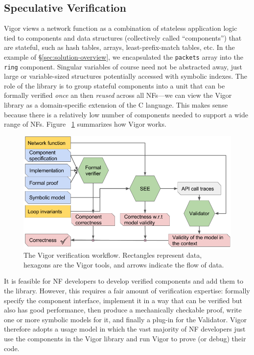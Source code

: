 \documentclass[letterpaper,twocolumn,10pt]{article}
\newcommand{\code}[1]{\lstinline{#1}}
\begin{document}
\subsection{Speculative Verification}
\label{sec:our-approach}

Vigor views a network function as a combination of stateless application logic tied to components and data structures (collectively called ``components'') that are stateful, such as hash tables, arrays, least-prefix-match tables, etc. In the example of \S\ref{sec:solution-overview}, we encapsulated the \code{packets} array into the \code{ring} component. Singular variables of course need not be abstracted away, just large or variable-sized structures potentially accessed with symbolic indexes. The role of the library is to group stateful components into a unit that can be formally verified {\em once} an then {\em reused} across all NFs---we can view the Vigor library as a domain-specific extension of the C language. This makes sense because there is a relatively low number of components needed to support a wide range of NFs. Figure~ \ref{fig:algo} summarizes how Vigor works.

\begin{figure}[]
    \includegraphics[width=\columnwidth]{figures/vigor_algorithm.png}
    \caption{The Vigor verification workflow. Rectangles represent data, hexagons are the Vigor tools, and arrows indicate the flow of data.}
    \label{fig:algo}
\end{figure}

It is feasible for NF developers to develop verified components and add them to the library. However, this requires a fair amount of verification expertise: formally specify the component interface, implement it in a way that can be verified but also has good performance, then produce a mechanically checkable proof, write one or more symbolic models for it, and finally a plug-in for the Validator. Vigor therefore adopts a usage model in which the vast majority of NF developers just use the components in the Vigor library and run Vigor to prove (or debug) their code.
\end{document}
